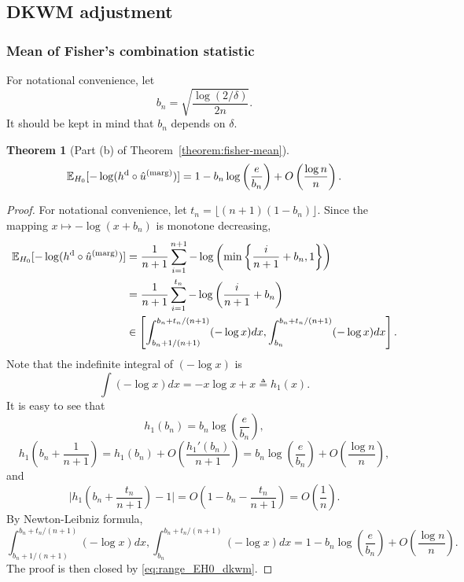 \documentclass[11pt]{article}
\newtheorem{thm}{Theorem}
\def\E{\mathbb{E}}
\def\marg{\textnormal{(marg)}}
\def\dkwm{\textnormal{d}}
\newcommand{\lb}{\left(}
\newcommand{\rb}{\right)}
\begin{document}

\subsection{DKWM adjustment}
\subsubsection{Mean of Fisher's combination statistic}
  For notational convenience, let
  \[b_{n} = \sqrt{\frac{\log(2/\delta)}{2n}}.\]
  It should be kept in mind that $b_n$ depends on $\delta$.
\begin{thm}[Part (b) of Theorem~\ref{theorem:fisher-mean}]\label{thm:fisher_DKWM}
  \[\E_{H_0}[-\log (h^\dkwm \circ \hat{u}^\marg)] = 1 - b_n\log\lb\frac{e}{b_n}\rb + O\lb\frac{\log n}{n}\rb.\]
\end{thm}

\begin{proof}
  For notational convenience, let $t_n = \lfloor (n + 1)(1 - b_n)\rfloor$. Since the mapping $x\mapsto -\log(x + b_n)$ is monotone decreasing,
  \begin{align}
    \E_{H_0}[-\log (h^\dkwm \circ \hat{u}^\marg)]
    &= \frac{1}{n+1}\sum_{i=1}^{n+1}-\log\lb\min\left\{\frac{i}{n+1} + b_{n}, 1\right\}\rb\nonumber\\
    &= \frac{1}{n+1}\sum_{i=1}^{t_n}-\log\lb\frac{i}{n+1} + b_{n}\rb\nonumber\\
    & \in \left[\int_{b_n + 1/(n + 1)}^{b_n + t_n / (n + 1)}(-\log x)dx, \int_{b_n}^{b_n + t_n / (n + 1)}(-\log x)dx\right].\label{eq:range_EH0_dkwm}
  \end{align}
  Note that the indefinite integral of $(-\log x)$ is 
  \[\int (-\log x)dx = -x\log x + x \triangleq h_1(x).\]
  It is easy to see that
  \[h_1\lb b_n\rb = b_n\log\lb\frac{e}{b_n}\rb,\]
  \[h_1\lb b_n + \frac{1}{n+1}\rb = h_1(b_n) + O\lb\frac{h_1'(b_n)}{n+1}\rb = b_n\log\lb\frac{e}{b_n}\rb + O\lb\frac{\log n}{n}\rb,\]
  and
  \[\bigg|h_1\lb b_n + \frac{t_n}{n+1}\rb - 1\bigg| = O\lb 1 - b_n - \frac{t_n}{n+1}\rb = O\lb\frac{1}{n}\rb.\]
  By Newton-Leibniz formula,
  \[\int_{b_n + 1/(n+1)}^{b_n + t_n / (n + 1)}(-\log x)dx, \int_{b_n}^{b_n + t_n / (n + 1)}(-\log x)dx = 1 - b_n\log\lb\frac{e}{b_n}\rb + O\lb\frac{\log n}{n}\rb.\]
  The proof is then closed by \eqref{eq:range_EH0_dkwm}.
\end{proof}
\end{document}

